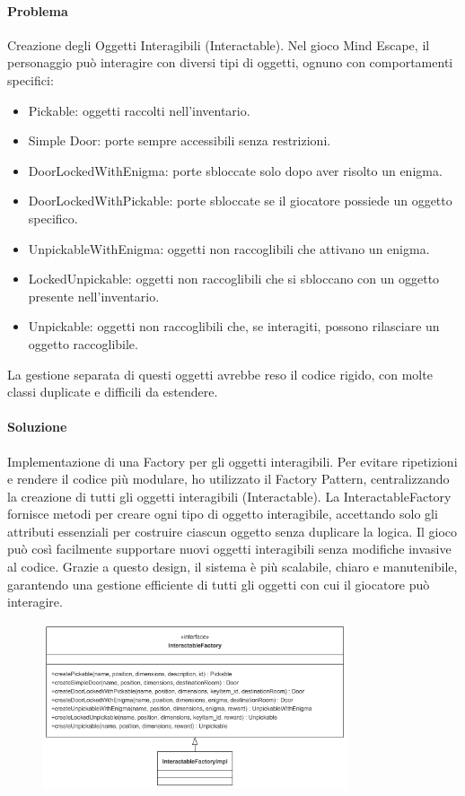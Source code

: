 \documentclass[a4paper,12pt]{report}
\begin{document}
\paragraph{Problema} %
Creazione degli Oggetti Interagibili (Interactable).
Nel gioco Mind Escape, il personaggio può interagire con diversi tipi di oggetti, ognuno con comportamenti specifici:
\begin{itemize}
	\item Pickable: oggetti raccolti nell'inventario.
	\item Simple Door: porte sempre accessibili senza restrizioni.
	\item DoorLockedWithEnigma: porte sbloccate solo dopo aver risolto un enigma.
	\item DoorLockedWithPickable: porte sbloccate se il giocatore possiede un oggetto specifico.
	\item UnpickableWithEnigma: oggetti non raccoglibili che attivano un enigma.
	\item LockedUnpickable: oggetti non raccoglibili che si sbloccano con un oggetto presente nell'inventario.
	\item Unpickable: oggetti non raccoglibili che, se interagiti, possono rilasciare un oggetto raccoglibile.
\end{itemize}
La gestione separata di questi oggetti avrebbe reso il codice rigido, con molte classi duplicate e difficili da estendere.
\paragraph{Soluzione} %
Implementazione di una Factory per gli oggetti interagibili.
Per evitare ripetizioni e rendere il codice più modulare, ho utilizzato il Factory Pattern, centralizzando la creazione di tutti gli oggetti interagibili (Interactable). La InteractableFactory fornisce metodi per creare ogni tipo di oggetto interagibile, accettando solo gli attributi essenziali per costruire ciascun oggetto senza duplicare la logica.
Il gioco può così facilmente supportare nuovi oggetti interagibili senza modifiche invasive al codice.
Grazie a questo design, il sistema è più scalabile, chiaro e manutenibile, garantendo una gestione efficiente di tutti gli oggetti con cui il giocatore può interagire.
\begin{figure}[h]
    \centering
    \includegraphics[width=0.8\textwidth]{img/interactableFactory.png}
    \label{img:interactableFactory}
\end{figure}
\end{document}

